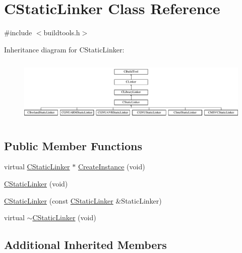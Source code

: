 \hypertarget{classCStaticLinker}{\section{C\-Static\-Linker Class Reference}
\label{classCStaticLinker}
}


{\ttfamily \#include $<$buildtools.\-h$>$}

Inheritance diagram for C\-Static\-Linker\-:\begin{figure}[H]
\begin{center}
\leavevmode
\includegraphics[height=3.131991cm]{da/de7/classCStaticLinker}
\end{center}
\end{figure}
\subsection*{Public Member Functions}
\begin{DoxyCompactItemize}
\item 
virtual \hyperlink{classCStaticLinker}{C\-Static\-Linker} $\ast$ \hyperlink{classCStaticLinker_a7e626491caa847ef207032ee600625db}{Create\-Instance} (void)
\item 
\hyperlink{classCStaticLinker_a48d7db697045d01f4aec128058795a5a}{C\-Static\-Linker} (void)
\item 
\hyperlink{classCStaticLinker_a8375886ef412c9641cdae5579a22c6b2}{C\-Static\-Linker} (const \hyperlink{classCStaticLinker}{C\-Static\-Linker} \&Static\-Linker)
\item 
virtual \hyperlink{classCStaticLinker_a1f80fe37324d907f7c3eb25572f1669e}{$\sim$\-C\-Static\-Linker} (void)
\end{DoxyCompactItemize}
\subsection*{Additional Inherited Members}


